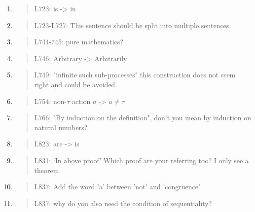\begin{enumerate}
\item \begin{quote}
    L723: is -> in
  \end{quote}

\item \begin{quote}
    L723-L727: This sentence should be split into multiple sentences.
  \end{quote}

\item \begin{quote}
    L744-745: pure mathematics?
  \end{quote}

\item \begin{quote}
    L746: Arbitrary -> Arbitrarily
  \end{quote}

\item \begin{quote}
    L749: "infinite such sub-processes" this construction does not seem right and could be avoided.
  \end{quote}

\item \begin{quote}
    L754: non-$\tau$ action $a$ -> $a\neq\tau$
  \end{quote}

\item \begin{quote}
    L766: "By induction on the definition", don't you mean by induction on natural numbers?
  \end{quote}

\item \begin{quote}
    L823: are -> is
  \end{quote}

\item \begin{quote}
    L831: `In above proof’ Which proof are your referring too? I only see a theorem.
  \end{quote}

\item \begin{quote}
    L837: Add the word 'a' between 'not' and 'congruence'
  \end{quote}

\item \begin{quote}
    L837: why do you also need the condition of sequentiality?
  \end{quote}


\end{enumerate}
